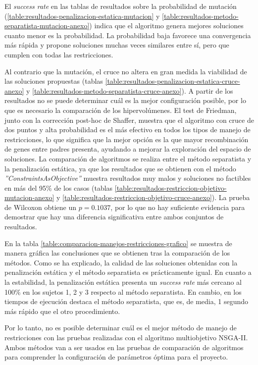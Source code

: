 El \textit{success rate} en las tablas de resultados sobre la probabilidad de mutación (\ref{table:resultados-penalizacion-estatica-mutacion} y \ref{table:resultados-metodo-separatista-mutacion-anexo}) indica que el algoritmo genera mejores soluciones cuanto menor es la probabilidad. La probabilidad baja favorece una convergencia más rápida y propone soluciones muchas veces similares entre sí, pero que cumplen con todas las restricciones.

Al contrario que la mutación, el cruce no altera en gran medida la viabilidad de las soluciones propuestas (tablas \ref{table:resultados-penalizacion-estatica-cruce-anexo} y \ref{table:resultados-metodo-separatista-cruce-anexo}). A partir de los resultados no se puede determinar cuál es la mejor configuración posible, por lo que es necesario la comparación de los hipervolúmenes. El test de Friedman, junto con la corrección post-hoc de Shaffer, muestra que el algoritmo con cruce de dos puntos y alta probabilidad es el más efectivo en todos los tipos de manejo de restricciones, lo que significa que la mejor opción es la que mayor recombinación de genes entre padres presenta, ayudando a mejorar la exploración del espacio de soluciones.
\newpage
La comparación de algoritmos se realiza entre el método separatista y la penalización estática, ya que los resultados que se obtienen con el método \textit{''ConstraintsAsObjective''} muestra resultados muy malos y soluciones no factibles en más del 95\% de los casos (tablas \ref{table:resultados-restriccion-objetivo-mutacion-anexo} y \ref{table:resultados-restriccion-objetivo-cruce-anexo}). La prueba de Wilcoxon obtiene un \textit{$p = 0.1037$}, por lo que no hay suficiente evidencia para demostrar que hay una diferencia significativa entre ambos conjuntos de resultados.

En la tabla \ref{table:comparacion-manejos-restricciones-grafico} se muestra de manera gráfica las conclusiones que se obtienen tras la comparación de los métodos. Como se ha explicado,  la calidad de las soluciones obtenidas con la penalización estática y el método separatista es prácticamente igual. En cuanto a la estabilidad, la penalización estática presenta un \textit{success rate} más cercano al 100\% en los sujetos 1, 2 y 3 respecto al método separatista. En cambio, en los tiempos de ejecución destaca el método separatista, que es, de media, 1 segundo más rápido que el otro procedimiento.

Por lo tanto, no es posible determinar cuál es el mejor método de manejo de restricciones con las pruebas realizadas con el algoritmo multiobjetivo NSGA-II. Ambos métodos van a ser usados en las pruebas de comparación de algoritmos para comprender la configuración de parámetros óptima para el proyecto.

